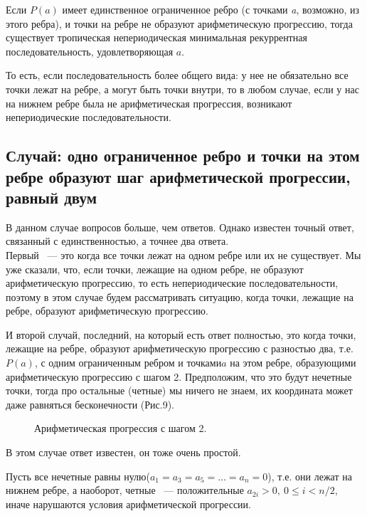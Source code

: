 \documentclass[russian]{lecture-notes}
\begin{document}
\begin{Corollary}
	Если $P(a)$ имеет единственное ограниченное ребро (с точками {\itshape a}, возможно, из этого ребра), и точки на ребре не образуют арифметическую
	прогрессию, тогда существует тропическая непериодическая минимальная рекуррентная
	последовательность, удовлетворяющая $a$.\\
\end{Corollary}


То есть, если последовательность более общего вида: у нее не обязательно все точки лежат на ребре, а могут быть точки внутри, то в любом случае, если у нас на нижнем ребре была не арифметическая прогрессия, возникают непериодические последовательности.

\subsection{ Случай: одно ограниченное ребро и точки на этом ребре образуют шаг арифметической прогрессии, равный двум}

В данном случае вопросов больше, чем ответов. Однако известен точный ответ, связанный с единственностью, а точнее два ответа. \\

Первый ~--- это когда
все точки лежат на одном ребре или их не существует. Мы уже сказали, что, если точки, лежащие на одном ребре, не образуют
арифметическую прогрессию, то есть непериодические последовательности, поэтому в этом случае будем рассматривать ситуацию, когда
точки, лежащие на ребре, образуют арифметическую прогрессию.

И второй случай, последний, на который есть ответ полностью, это когда точки, лежащие на ребре, образуют арифметическую прогрессию с разностью два, т.е. $P(a)$, с одним ограниченным ребром и точками$a$ на этом ребре, образующими арифметическую прогрессию с шагом 2. Предположим, что это будут нечетные точки, тогда про остальные (четные) мы ничего не знаем, их координата может даже равняться бесконечности (Рис.9).

\begin{figure}[h!]
\caption{Арифметическая прогрессия с шагом 2.}
\end{figure}


В этом случае ответ известен, он тоже очень простой.

Пусть все нечетные равны нулю($a_1=a_3=a_5=\ldots =a_n=0$), т.е. они лежат на нижнем ребре, а наоборот, четные ~--- положительные $a_{2i}>0,\:0\leq i<n/2$, иначе нарушаются условия арифметической прогрессии.
\end{document}
